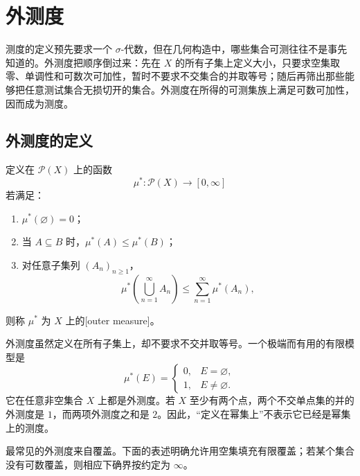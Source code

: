 \section{外测度}
\label{b1:sec:0203}

测度的定义预先要求一个 \(\sigma\)-代数，但在几何构造中，哪些集合可测往往不是事先知道的。外测度把顺序倒过来：先在 \(X\) 的所有子集上定义大小，只要求空集取零、单调性和可数次可加性，暂时不要求不交集合的并取等号；随后再筛出那些能够把任意测试集合无损切开的集合。外测度在所得的可测集族上满足可数可加性，因而成为测度。

\subsection{外测度的定义}
\label{b1:subsec:020301}

\begin{definition}
\label{b1:def:outer-measure}
定义在 \(\mathcal P(X)\) 上的函数
\[
\mu^*:\mathcal P(X)\longrightarrow[0,\infty]
\]
若满足：
\begin{enumerate}
  \item\label{b1:item:outer-empty} \(\mu^*(\varnothing)=0\)；
  \item\label{b1:item:outer-monotone} 当 \(A\subseteq B\) 时，\(\mu^*(A)\leq\mu^*(B)\)；
  \item\label{b1:item:outer-subadditive} 对任意子集列 \((A_n)_{n\geq1}\)，
  \[
  \mu^*\left(\bigcup_{n=1}^{\infty}A_n\right)
  \leq\sum_{n=1}^{\infty}\mu^*(A_n),
  \]
\end{enumerate}
则称 \(\mu^*\) 为 \(X\) 上的[outer measure]。
\end{definition}

外测度虽然定义在所有子集上，却不要求不交并取等号。一个极端而有用的有限模型是
\[
\mu^*(E)=
\begin{cases}
0,&E=\varnothing,\\
1,&E\neq\varnothing.
\end{cases}
\]
它在任意非空集合 \(X\) 上都是外测度。若 \(X\) 至少有两个点，两个不交单点集的并的外测度是 \(1\)，而两项外测度之和是 \(2\)。因此，“定义在幂集上”不表示它已经是幂集上的测度。

\ProseParagraphBreak

最常见的外测度来自覆盖。下面的表述明确允许用空集填充有限覆盖；若某个集合没有可数覆盖，则相应下确界按约定为 \(\infty\)。

